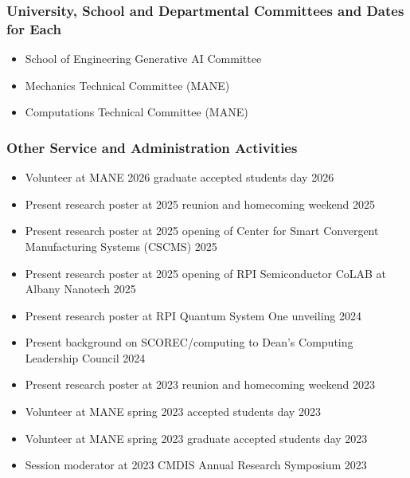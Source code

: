 

\subsubsection{University, School and Departmental Committees and Dates for Each}
\begin{itemize}
  \item School of Engineering Generative AI Committee \hfill{}
\end{itemize}
\begin{itemize}
  \item Mechanics Technical Committee (MANE) \hfill {}
  \item Computations Technical Committee (MANE) \hfill {}
\end{itemize}

\subsubsection{Other Service and Administration Activities}
\begin{itemize}
\item Volunteer at MANE 2026 graduate accepted students day \hfill{2026}
\item Present research poster at 2025 reunion and homecoming weekend \hfill{2025}
\item Present research poster at 2025 opening of Center for Smart Convergent Manufacturing Systems (CSCMS) \hfill{2025}
\item Present research poster at 2025 opening of RPI Semiconductor CoLAB at Albany Nanotech \hfill{2025}
\item Present research poster at RPI Quantum System One unveiling \hfill{2024}
\item Present background on SCOREC/computing to Dean's Computing Leadership Council \hfill{2024}
\item Present research poster at 2023 reunion and homecoming weekend \hfill{2023}
\item Volunteer at MANE spring 2023 accepted students day \hfill{2023}
\item Volunteer at MANE spring 2023 graduate accepted students day \hfill{2023}
\item Session moderator at 2023 CMDIS Annual Research Symposium \hfill{2023}
\end{itemize}


